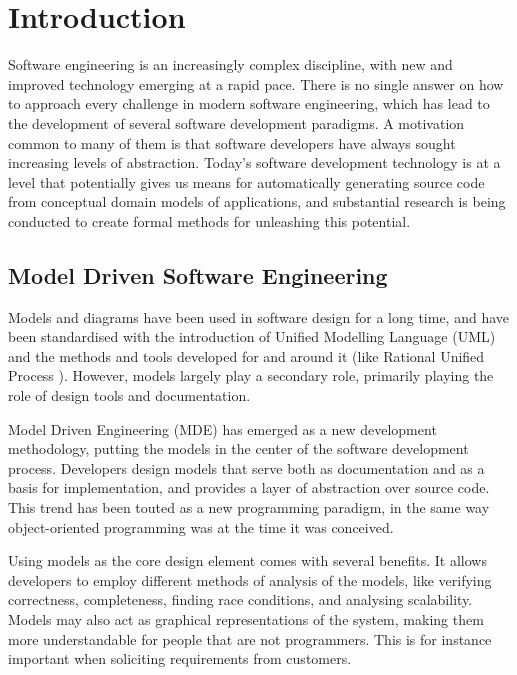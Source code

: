 \chapter{Introduction}
\label{chap:introduction}
 
Software engineering is an increasingly complex discipline, with new and
improved technology emerging at a rapid pace. There is no single answer on how
to approach every challenge in modern software engineering, which has lead to
the development of several software development paradigms. A motivation common
to many of them is that software developers have always sought increasing levels
of abstraction.
Today's software development technology is at a level that potentially gives us
means for automatically generating source code from conceptual domain models of
applications, and substantial research is being conducted to create formal
methods for unleashing this potential.


\section{Model Driven Software Engineering}

Models and diagrams have been used in software design for a long time, and have
been standardised with the introduction of Unified Modelling Language (UML)
\cite{umlInfra} and the methods and tools developed for and around it (like
Rational Unified Process \cite{kruchten2004rational}).
However, models largely play a secondary role, primarily playing the role of
design tools and documentation.

Model Driven Engineering (MDE) \cite{kent2002model} has emerged as a new
development methodology, putting the models in the center of the software
development process. Developers design models that serve both as documentation
and as a basis for implementation, and provides a layer of abstraction over
source code. This trend has been touted as a new programming paradigm, in the
same way object-oriented programming was at the time it was conceived.

Using models as the core design element comes with several benefits. It allows
developers to employ different methods of analysis of the models, like verifying
correctness, completeness, finding race conditions, and analysing scalability.
Models may also act as graphical representations of the system, making them more
understandable for people that are not programmers. This is for instance
important when soliciting requirements from customers.

